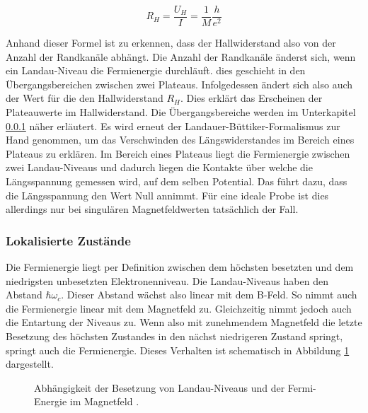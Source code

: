 \begin{equation}
R_H=\frac{U_H}{I}=\frac{1}{M}\frac{h}{e^2}
\label{eq:U_Hall_simpel}
\end{equation}

Anhand dieser Formel ist zu erkennen, dass der Hallwiderstand also von der Anzahl der Randkanäle abhängt. Die Anzahl der Randkanäle änderst sich, wenn ein Landau-Niveau die Fermienergie durchläuft. dies geschieht in den Übergangsbereichen zwischen zwei Plateaus. Infolgedessen ändert sich also auch der Wert für die den Hallwiderstand $R_H$. Dies erklärt das Erscheinen der Plateauwerte im Hallwiderstand. Die Übergangsbereiche werden im Unterkapitel \ref{sec:lokalisierte Zust} näher erläutert. 
Es wird erneut der Landauer-Büttiker-Formalismus zur Hand genommen, um das Verschwinden des Längswiderstandes im Bereich eines Plateaus zu erklären. Im Bereich eines Plateaus liegt die Fermienergie zwischen zwei Landau-Niveaus und dadurch liegen die Kontakte über welche die Längsspannung gemessen wird, auf dem selben Potential. Das führt dazu, dass die Längsspannung den Wert Null annimmt. Für eine ideale Probe ist dies allerdings nur bei singulären Magnetfeldwerten tatsächlich der Fall.


\subsubsection{Lokalisierte Zustände}
\label{sec:lokalisierte Zust}

Die Fermienergie liegt per Definition zwischen dem höchsten besetzten und dem niedrigsten unbesetzten Elektronenniveau. Die Landau-Niveaus haben den Abstand $\hbar\omega_c$. Dieser Abstand wächst also linear mit dem B-Feld. So nimmt auch die Fermienergie linear mit dem Magnetfeld zu. Gleichzeitig nimmt jedoch auch die Entartung der Niveaus zu. Wenn also mit zunehmendem Magnetfeld die letzte Besetzung des höchsten Zustandes in den nächst niedrigeren Zustand springt, springt auch die Fermienergie. Dieses Verhalten ist schematisch in Abbildung \ref{fig:Lokalisierte_Zust_Anleitungsheft} dargestellt.

\begin{figure}[h]
	\centering
	\caption[Fermi-Energie lokalisierter Zustände]{
		Abhängigkeit der Besetzung von Landau-Niveaus und der Fermi-Energie im Magnetfeld \cite{anleitung}.
	}
	\label{fig:Lokalisierte_Zust_Anleitungsheft}
\end{figure}

